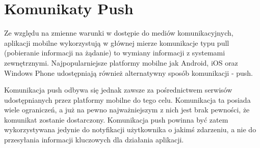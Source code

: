 \section{Komunikaty Push}
\label{sec:push}

Ze względu na zmienne warunki w dostępie do mediów komunikacyjnych, aplikacji mobilne wykorzystują w głównej mierze komunikacje typu pull (pobieranie informacji na żądanie) to wymiany informacji z systemami zewnętrznymi. Najpopularniejsze platformy mobilne jak Android, iOS oraz Windows Phone udostępniają również alternatywny sposób komunikacji - push. 

Komunikacja push odbywa się jednak zawsze za pośrednictwem serwisów udostępnianych przez platformy mobilne do tego celu. Komunikacja ta posiada wiele ograniczeń, a już na pewno najważniejszym z nich jest brak pewności, że komunikat zostanie dostarczony. Komunikacja push powinna być zatem wykorzystywana jedynie do notyfikacji użytkownika o jakimś zdarzeniu, a nie do przesyłania informacji kluczowych dla działania aplikacji. 
